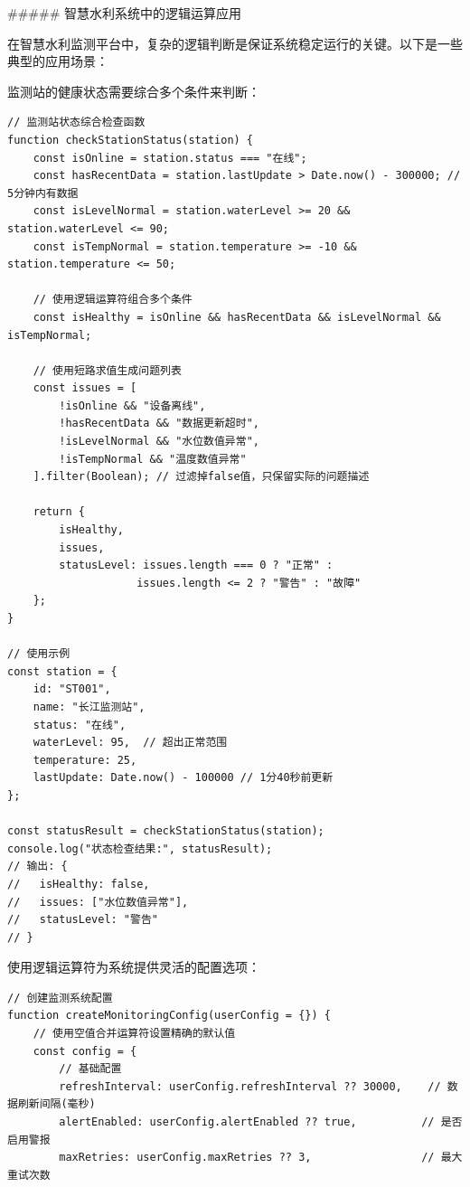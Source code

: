 {##### 智慧水利系统中的逻辑运算应用

在智慧水利监测平台中，复杂的逻辑判断是保证系统稳定运行的关键。以下是一些典型的应用场景：


监测站的健康状态需要综合多个条件来判断：

\begin{lstlisting}[style=javascript]
// 监测站状态综合检查函数
function checkStationStatus(station) {
    const isOnline = station.status === "在线";
    const hasRecentData = station.lastUpdate > Date.now() - 300000; // 5分钟内有数据
    const isLevelNormal = station.waterLevel >= 20 && station.waterLevel <= 90;
    const isTempNormal = station.temperature >= -10 && station.temperature <= 50;
    
    // 使用逻辑运算符组合多个条件
    const isHealthy = isOnline && hasRecentData && isLevelNormal && isTempNormal;
    
    // 使用短路求值生成问题列表
    const issues = [
        !isOnline && "设备离线",
        !hasRecentData && "数据更新超时", 
        !isLevelNormal && "水位数值异常",
        !isTempNormal && "温度数值异常"
    ].filter(Boolean); // 过滤掉false值，只保留实际的问题描述
    
    return {
        isHealthy,
        issues,
        statusLevel: issues.length === 0 ? "正常" : 
                    issues.length <= 2 ? "警告" : "故障"
    };
}

// 使用示例
const station = {
    id: "ST001",
    name: "长江监测站",
    status: "在线",
    waterLevel: 95,  // 超出正常范围
    temperature: 25,
    lastUpdate: Date.now() - 100000 // 1分40秒前更新
};

const statusResult = checkStationStatus(station);
console.log("状态检查结果:", statusResult);
// 输出: {
//   isHealthy: false,
//   issues: ["水位数值异常"],
//   statusLevel: "警告"
// }
\end{lstlisting}


使用逻辑运算符为系统提供灵活的配置选项：

\begin{lstlisting}[style=javascript]
// 创建监测系统配置
function createMonitoringConfig(userConfig = {}) {
    // 使用空值合并运算符设置精确的默认值
    const config = {
        // 基础配置
        refreshInterval: userConfig.refreshInterval ?? 30000,    // 数据刷新间隔(毫秒)
        alertEnabled: userConfig.alertEnabled ?? true,          // 是否启用警报
        maxRetries: userConfig.maxRetries ?? 3,                 // 最大重试次数
        

\end{lstlisting}}
